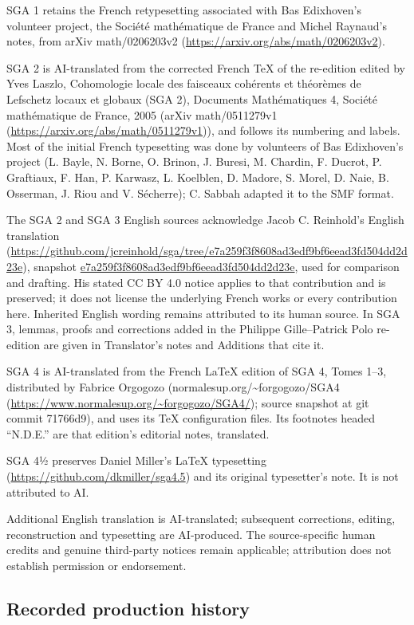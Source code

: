SGA 1 retains the French retypesetting associated with Bas Edixhoven’s volunteer project, the Société mathématique de France and Michel Raynaud’s notes, from arXiv math/0206203v2 (\url{https://arxiv.org/abs/math/0206203v2}).

SGA 2 is AI-translated from the corrected French TeX of the re-edition edited by Yves Laszlo, Cohomologie locale des faisceaux cohérents et théorèmes de Lefschetz locaux et globaux (SGA 2), Documents Mathématiques 4, Société mathématique de France, 2005 (arXiv math/0511279v1 (\url{https://arxiv.org/abs/math/0511279v1})), and follows its numbering and labels. Most of the initial French typesetting was done by volunteers of Bas Edixhoven’s project (L. Bayle, N. Borne, O. Brinon, J. Buresi, M. Chardin, F. Ducrot, P. Graftiaux, F. Han, P. Karwasz, L. Koelblen, D. Madore, S. Morel, D. Naie, B. Osserman, J. Riou and V. Sécherre); C. Sabbah adapted it to the SMF format.

The SGA 2 and SGA 3 English sources acknowledge Jacob C. Reinhold’s English translation (\url{https://github.com/jcreinhold/sga/tree/e7a259f3f8608ad3edf9bf6eead3fd504dd2d23e}), snapshot \url{e7a259f3f8608ad3edf9bf6eead3fd504dd2d23e}, used for comparison and drafting. His stated CC BY 4.0 notice applies to that contribution and is preserved; it does not license the underlying French works or every contribution here. Inherited English wording remains attributed to its human source. In SGA 3, lemmas, proofs and corrections added in the Philippe Gille–Patrick Polo re-edition are given in Translator's notes and Additions that cite it.

SGA 4 is AI-translated from the French LaTeX edition of SGA 4, Tomes 1–3, distributed by Fabrice Orgogozo (normalesup.org/\textasciitilde{}forgogozo/SGA4 (\url{https://www.normalesup.org/~forgogozo/SGA4/}); source snapshot at git commit 71766d9), and uses its TeX configuration files. Its footnotes headed “N.D.E.” are that edition's editorial notes, translated.

SGA 4½ preserves Daniel Miller’s LaTeX typesetting (\url{https://github.com/dkmiller/sga4.5}) and its original typesetter’s note. It is not attributed to AI.

Additional English translation is AI-translated; subsequent corrections, editing, reconstruction and typesetting are AI-produced. The source-specific human credits and genuine third-party notices remain applicable; attribution does not establish permission or endorsement.


\subsection*{Recorded production history}


